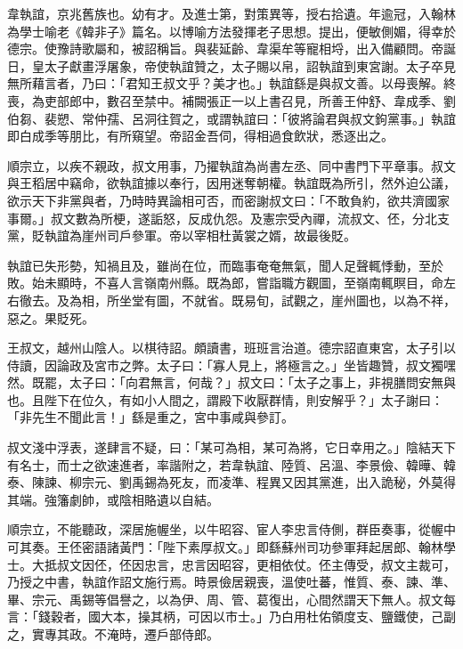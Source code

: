 
\begin{pinyinscope}

 韋執誼，京兆舊族也。幼有才。及進士第，對策異等，授右拾遺。年逾冠，入翰林為學士喻老《韓非子》篇名。以博喻方法發揮老子思想。提出，便敏側媚，得幸於德宗。使豫詩歌屬和，被詔稱旨。與裴延齡、韋渠牟等寵相埒，出入備顧問。帝誕日，皇太子獻畫浮屠象，帝使執誼贊之，太子賜以帛，詔執誼到東宮謝。太子卒見無所藉言者，乃曰：「君知王叔文乎？美才也。」執誼繇是與叔文善。以母喪解。終喪，為吏部郎中，數召至禁中。補闕張正一以上書召見，所善王仲舒、韋成季、劉伯芻、裴愬、常仲孺、呂洞往賀之，或謂執誼曰：「彼將論君與叔文鉤黨事。」執誼即白成季等朋比，有所窺望。帝詔金吾伺，得相過食飲狀，悉逐出之。



 順宗立，以疾不親政，叔文用事，乃擢執誼為尚書左丞、同中書門下平章事。叔文與王稻居中竊命，欲執誼據以奉行，因用迷奪朝權。執誼既為所引，然外迫公議，欲示天下非黨與者，乃時時異論相可否，而密謝叔文曰：「不敢負約，欲共濟國家事爾。」叔文數為所梗，遂詬怒，反成仇怨。及憲宗受內禪，流叔文、伾，分北支黨，貶執誼為崖州司戶參軍。帝以宰相杜黃裳之婿，故最後貶。



 執誼已失形勢，知禍且及，雖尚在位，而臨事奄奄無氣，聞人足聲輒悸動，至於敗。始未顯時，不喜人言嶺南州縣。既為郎，嘗詣職方觀圖，至嶺南輒瞑目，命左右徹去。及為相，所坐堂有圖，不就省。既易旬，試觀之，崖州圖也，以為不祥，惡之。果貶死。



 王叔文，越州山陰人。以棋待詔。頗讀書，班班言治道。德宗詔直東宮，太子引以侍讀，因論政及宮市之弊。太子曰：「寡人見上，將極言之。」坐皆趣贊，叔文獨嘿然。既罷，太子曰：「向君無言，何哉？」叔文曰：「太子之事上，非視膳問安無與也。且陛下在位久，有如小人間之，謂殿下收厭群情，則安解乎？」太子謝曰：「非先生不聞此言！」繇是重之，宮中事咸與參訂。



 叔文淺中浮表，遂肆言不疑，曰：「某可為相，某可為將，它日幸用之。」陰結天下有名士，而士之欲速進者，率諧附之，若韋執誼、陸質、呂溫、李景儉、韓曄、韓泰、陳諫、柳宗元、劉禹錫為死友，而凌準、程異又因其黨進，出入詭秘，外莫得其端。強籓劇帥，或陰相賂遺以自結。



 順宗立，不能聽政，深居施幄坐，以牛昭容、宦人李忠言侍側，群臣奏事，從幄中可其奏。王伾密語諸黃門：「陛下素厚叔文。」即繇蘇州司功參軍拜起居郎、翰林學士。大抵叔文因伾，伾因忠言，忠言因昭容，更相依仗。伾主傳受，叔文主裁可，乃授之中書，執誼作詔文施行焉。時景儉居親喪，溫使吐蕃，惟質、泰、諫、準、畢、宗元、禹錫等倡譽之，以為伊、周、管、葛復出，心間然謂天下無人。叔文每言：「錢穀者，國大本，操其柄，可因以市士。」乃白用杜佑領度支、鹽鐵使，己副之，實專其政。不淹時，遷戶部侍郎。




\end{pinyinscope}
